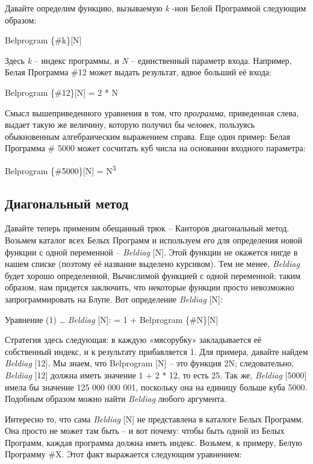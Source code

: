 \documentclass[../main.tex]{subfiles}
\begin{document}
Давайте определим функцию, вызываемую \emph{k} -нон Белой Программой следующим образом:

Belprogram \{\#k\}{[}N{]}

Здесь \emph{k} \--- индекс программы, и \emph{N} \--- единственный параметр входа. Например, Белая Программа \#12 может выдать результат, вдвое больший её входа:

Belprogram \{\#12\}{[}N{]} = 2 * N

Смысл вышеприведенного уравнения в том, что \emph{программа}, приведенная слева, выдает такую же величину, которую получил бы \emph{человек}, пользуясь обыкновенным алгебраическим выражением справа. Еще один пример: Белая Программа \# 5000 может сосчитать куб числа на основании входного параметра:

Belprogram \{\#5000\}{[}N{]} = N\textsuperscript{3}


\subsection{Диагональный метод}

Давайте теперь применим обещанный трюк \--- Канторов диагональный метод. Возьмем каталог всех Белых Программ и используем его для определения новой функции с одной переменной \--- \emph{Beldiag} {[}N{]}. Этой функции не окажется нигде в нашем списке (поэтому её название выделено курсивом). Тем не менее, \emph{Beldiag} будет хорошо определенной, Вычислимой функцией с одной переменной; таким образом, нам придется заключить, что некоторые функции просто невозможно запрограммировать на Блупе. Вот определение \emph{Beldiag} {[}N{]}:

Уравнение (1) \ldots{} \emph{Beldiag} {[}N{]}: = 1 + Belprogram \{\#N\}{[}N{]}

Стратегия здесь следующая: в каждую «мясорубку» закладывается её собственный индекс, и к результату прибавляется 1. Для примера, давайте найдем \emph{Beldiag} {[}12{]}. Мы знаем, что Belprogram {[}N{]} \--- это функция 2N; следовательно, \emph{Beldiag} {[}12{]} должна иметь значение 1 + 2 * 12, то есть 25. Так же, \emph{Beldiag} {[}5000{]} имела бы значение 125 000 000 001, поскольку она на единицу больше куба 5000. Подобным образом можно найти \emph{Beldiag} любого аргумента.

Интересно то, что сама \emph{Beldiag} {[}N{]} не представлена в каталоге Белых Программ. Она просто не может там быть \--- и вот почему: чтобы быть одной из Белых Программ, каждая программа должна иметь индекс. Возьмем, к примеру, Белую Программу \#X\@. Этот факт выражается следующим уравнением:
\end{document}
